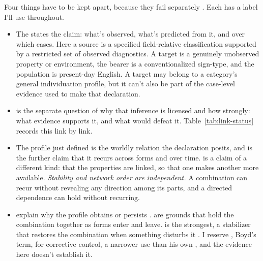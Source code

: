 \documentclass[12pt]{article}
\begin{document}
Four things have to be kept apart, because they fail
separately \citep[adapted from][11--12]{reynolds2026projectibilityHistory}. Each
has a label I'll use throughout.

\begin{itemize}
\item The  states the claim: what's observed,
  what's predicted from it, and over which cases. Here a source is a specified
  field-relative classification supported by a restricted set of observed
  diagnostics. A target is a genuinely unobserved property or environment,
  the bearer is a conventionalized sign-type, and the population is
  present-day English. A target may belong to a category's general
  individuation profile, but it can't also be part of the case-level evidence
  used to make that declaration.
\item {} is the separate question of why that inference is
  licensed and how strongly: what evidence supports it, and what would defeat
  it. Table~\ref{tab:link-status} records this link by link.
\item The profile just defined is the worldly relation the declaration posits,
  and  is the further claim that it recurs across forms and
  over time.  is a claim of a different kind: that the
  properties are linked, so that one makes another more available.
  \emph{Stability and network order are independent.} A combination can
  recur without revealing any direction among its parts, and a directed
  dependence can hold without recurring.
\item {} explain why the profile obtains or
  persists \citep[12]{reynolds2026projectibilityHistory}.
   are grounds that hold the combination together as forms
  enter and leave.  is the strongest, a stabilizer
  that restores the combination when something disturbs
  it \citep[5]{reynolds2026notEveryStableCluster}. I reserve
  , Boyd's term, for corrective control, a narrower use
  than his own \citep[143]{boyd1999}, and the evidence here doesn't
  establish it.
\end{itemize}
\end{document}
